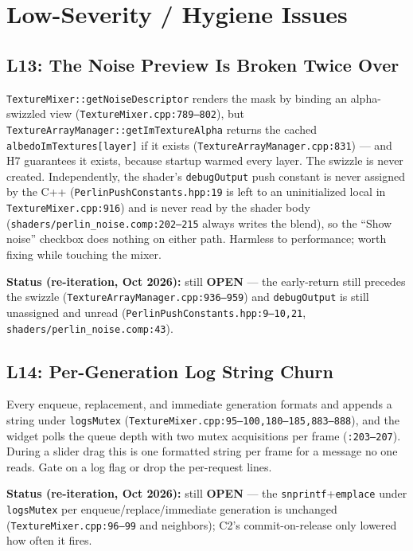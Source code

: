 \documentclass[11pt,a4paper]{article}
\begin{document}
\section{Low-Severity / Hygiene Issues}

\subsection{L13: The Noise Preview Is Broken Twice Over}
\label{sec:l13}

\texttt{TextureMixer::getNoiseDescriptor} renders the mask by binding an
alpha-swizzled view (\texttt{TextureMixer.cpp:789--802}), but
\texttt{TextureArrayManager::getImTextureAlpha} returns the cached
\texttt{albedoImTextures[layer]} if it exists
(\texttt{TextureArrayManager.cpp:831}) --- and H7 guarantees it exists, because
startup warmed every layer. The swizzle is never created. Independently, the
shader's \texttt{debugOutput} push constant is never assigned by the C++
(\texttt{PerlinPushConstants.hpp:19} is left to an uninitialized local in
\texttt{TextureMixer.cpp:916}) and is never read by the shader body
(\texttt{shaders/perlin\_noise.comp:202--215} always writes the blend), so the
``Show noise'' checkbox does nothing on either path. Harmless to performance;
worth fixing while touching the mixer.

\textbf{Status (re-iteration, Oct 2026):} still \textbf{OPEN} --- the
early-return still precedes the swizzle
(\texttt{TextureArrayManager.cpp:936--959}) and \texttt{debugOutput} is still
unassigned and unread (\texttt{PerlinPushConstants.hpp:9--10,21},
\texttt{shaders/perlin\_noise.comp:43}).

\subsection{L14: Per-Generation Log String Churn}
\label{sec:l14}

Every enqueue, replacement, and immediate generation formats and appends a
string under \texttt{logsMutex} (\texttt{TextureMixer.cpp:95--100,180--185,883--888}),
and the widget polls the queue depth with two mutex acquisitions per frame
(\texttt{:203--207}). During a slider drag this is one formatted string per
frame for a message no one reads. Gate on a log flag or drop the per-request
lines.

\textbf{Status (re-iteration, Oct 2026):} still \textbf{OPEN} --- the
\texttt{snprintf}+\texttt{emplace} under \texttt{logsMutex} per
enqueue/replace/immediate generation is unchanged
(\texttt{TextureMixer.cpp:96--99} and neighbors); C2's commit-on-release only
lowered how often it fires.
\end{document}
